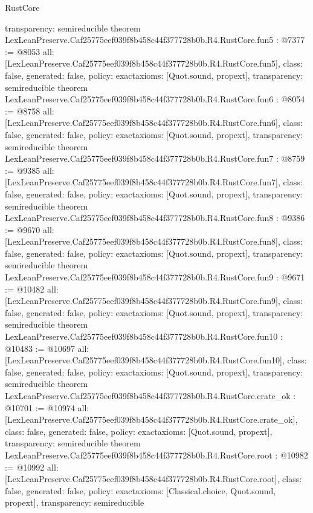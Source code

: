 \begin{lexlean}{RustCore}
\begin{coremodule}
{  transparency: semireducible
}
theorem LexLeanPreserve.Caf25775eef039f8b458c44f377728b0b.R4.RustCore.fun5 : @7377 := @8053 {
  all: [LexLeanPreserve.Caf25775eef039f8b458c44f377728b0b.R4.RustCore.fun5],
  class: false,
  generated: false,
  policy: exact{axioms: [Quot.sound, propext]},
  transparency: semireducible
}
theorem LexLeanPreserve.Caf25775eef039f8b458c44f377728b0b.R4.RustCore.fun6 : @8054 := @8758 {
  all: [LexLeanPreserve.Caf25775eef039f8b458c44f377728b0b.R4.RustCore.fun6],
  class: false,
  generated: false,
  policy: exact{axioms: [Quot.sound, propext]},
  transparency: semireducible
}
theorem LexLeanPreserve.Caf25775eef039f8b458c44f377728b0b.R4.RustCore.fun7 : @8759 := @9385 {
  all: [LexLeanPreserve.Caf25775eef039f8b458c44f377728b0b.R4.RustCore.fun7],
  class: false,
  generated: false,
  policy: exact{axioms: [Quot.sound, propext]},
  transparency: semireducible
}
theorem LexLeanPreserve.Caf25775eef039f8b458c44f377728b0b.R4.RustCore.fun8 : @9386 := @9670 {
  all: [LexLeanPreserve.Caf25775eef039f8b458c44f377728b0b.R4.RustCore.fun8],
  class: false,
  generated: false,
  policy: exact{axioms: [Quot.sound, propext]},
  transparency: semireducible
}
theorem LexLeanPreserve.Caf25775eef039f8b458c44f377728b0b.R4.RustCore.fun9 : @9671 := @10482 {
  all: [LexLeanPreserve.Caf25775eef039f8b458c44f377728b0b.R4.RustCore.fun9],
  class: false,
  generated: false,
  policy: exact{axioms: [Quot.sound, propext]},
  transparency: semireducible
}
theorem LexLeanPreserve.Caf25775eef039f8b458c44f377728b0b.R4.RustCore.fun10 : @10483 := @10697 {
  all: [LexLeanPreserve.Caf25775eef039f8b458c44f377728b0b.R4.RustCore.fun10],
  class: false,
  generated: false,
  policy: exact{axioms: [Quot.sound, propext]},
  transparency: semireducible
}
theorem LexLeanPreserve.Caf25775eef039f8b458c44f377728b0b.R4.RustCore.crate_ok : @10701 := @10974 {
  all: [LexLeanPreserve.Caf25775eef039f8b458c44f377728b0b.R4.RustCore.crate_ok],
  class: false,
  generated: false,
  policy: exact{axioms: [Quot.sound, propext]},
  transparency: semireducible
}
theorem LexLeanPreserve.Caf25775eef039f8b458c44f377728b0b.R4.RustCore.root : @10982 := @10992 {
  all: [LexLeanPreserve.Caf25775eef039f8b458c44f377728b0b.R4.RustCore.root],
  class: false,
  generated: false,
  policy: exact{axioms: [Classical.choice, Quot.sound, propext]},
  transparency: semireducible
}


\end{coremodule}
\end{lexlean}
